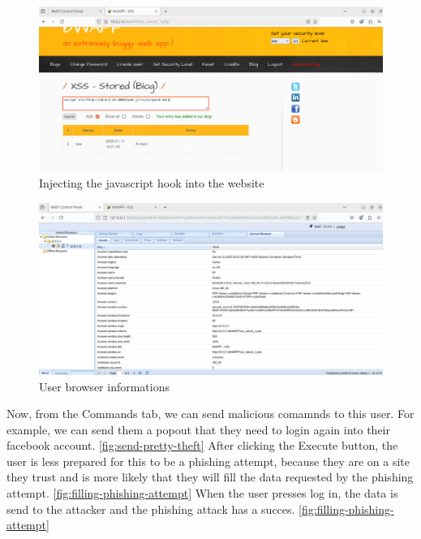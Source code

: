 \documentclass{article}
\begin{document}
\begin{figure}
    \centering
    \includegraphics[width=1\linewidth]{Figures/beef/inject-hook.png}
    \caption{\label{fig:inject-hook}Injecting the javascript hook into the website}
\end{figure}

\begin{figure}
    \centering
    \includegraphics[width=1\linewidth]{Figures/beef/browser-details.png}
    \caption{\label{fig:browser-details}User browser informations}
\end{figure}


Now, from the Commands tab, we can send malicious comamnds to this user. For example, we can send them a popout that they need to login again into their facebook account. \ref{fig:send-pretty-theft}
After clicking the Execute button, the user is less prepared for this to be a phishing attempt, because they are on a site they trust and is more likely that they will fill the data requested by the phishing attempt. \ref{fig:filling-phishing-attempt}
When the user presses log in, the data is send to the attacker and the phishing attack has a succes. \ref{fig:filling-phishing-attempt}
\end{document}

